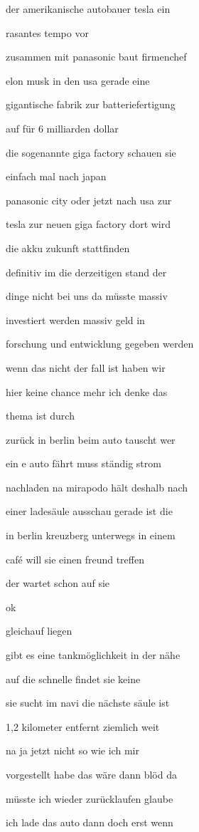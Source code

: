 \documentclass[a4paper, 11pt]{book} %
\begin{document}
der amerikanische autobauer tesla ein

rasantes tempo vor

zusammen mit panasonic baut firmenchef

elon musk in den usa gerade eine

gigantische fabrik zur batteriefertigung

auf für 6 milliarden dollar

die sogenannte giga factory schauen sie

einfach mal nach japan

panasonic city oder jetzt nach usa zur

tesla zur neuen giga factory dort wird

die akku zukunft stattfinden

definitiv im die derzeitigen stand der

dinge nicht bei uns da müsste massiv

investiert werden massiv geld in

forschung und entwicklung gegeben werden

wenn das nicht der fall ist haben wir

hier keine chance mehr ich denke das

thema ist durch

zurück in berlin beim auto tauscht wer

ein e auto fährt muss ständig strom

nachladen na mirapodo hält deshalb nach

einer ladesäule ausschau gerade ist die

in berlin kreuzberg unterwegs in einem

café will sie einen freund treffen

der wartet schon auf sie

ok

gleichauf liegen

gibt es eine tankmöglichkeit in der nähe

auf die schnelle findet sie keine

sie sucht im navi die nächste säule ist

1,2 kilometer entfernt ziemlich weit

na ja jetzt nicht so wie ich mir

vorgestellt habe das wäre dann blöd da

müsste ich wieder zurücklaufen glaube

ich lade das auto dann doch erst wenn
\end{document}
